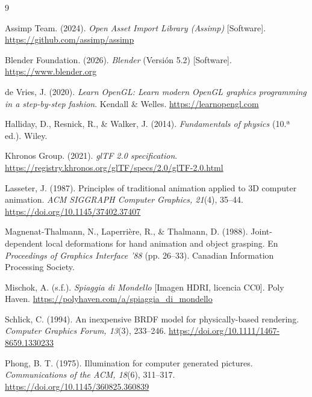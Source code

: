 \documentclass[12pt,letterpaper]{article}
\begin{document}
\begin{thebibliography}{9}

Assimp Team. (2024). \emph{Open Asset Import Library (Assimp)} [Software].
\url{https://github.com/assimp/assimp}

Blender Foundation. (2026). \emph{Blender} (Versión 5.2) [Software].
\url{https://www.blender.org}

de Vries, J. (2020). \emph{Learn OpenGL: Learn modern OpenGL graphics programming in a
step-by-step fashion}. Kendall \& Welles. \url{https://learnopengl.com}

Halliday, D., Resnick, R., \& Walker, J. (2014). \emph{Fundamentals of physics} (10.ª ed.).
Wiley.

Khronos Group. (2021). \emph{glTF 2.0 specification}.
\url{https://registry.khronos.org/glTF/specs/2.0/glTF-2.0.html}

Lasseter, J. (1987). Principles of traditional animation applied to 3D computer animation.
\emph{ACM SIGGRAPH Computer Graphics, 21}(4), 35--44.
\url{https://doi.org/10.1145/37402.37407}

Magnenat-Thalmann, N., Laperrière, R., \& Thalmann, D. (1988). Joint-dependent local
deformations for hand animation and object grasping. En \emph{Proceedings of Graphics
Interface '88} (pp. 26--33). Canadian Information Processing Society.

Mischok, A. (s.f.). \emph{Spiaggia di Mondello} [Imagen HDRI, licencia CC0]. Poly Haven.
\url{https://polyhaven.com/a/spiaggia_di_mondello}

Schlick, C. (1994). An inexpensive BRDF model for physically-based rendering.
\emph{Computer Graphics Forum, 13}(3), 233--246.
\url{https://doi.org/10.1111/1467-8659.1330233}

Phong, B. T. (1975). Illumination for computer generated pictures. \emph{Communications of
the ACM, 18}(6), 311--317. \url{https://doi.org/10.1145/360825.360839}

\end{thebibliography}
\end{document}
